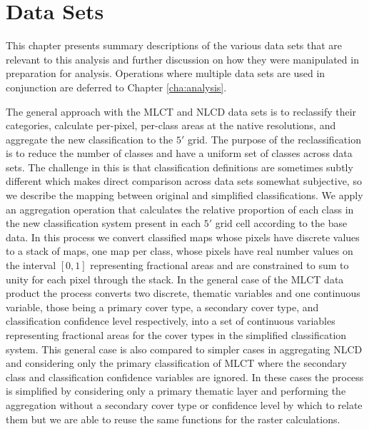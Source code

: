 









\graphicspath{ {datasets/} }


\chapter{Data Sets}
\label{cha:datasets}

This chapter presents summary descriptions of the various data sets
that are relevant to this analysis and further discussion on how they
were manipulated in preparation for analysis.  Operations where
multiple data sets are used in conjunction are deferred to Chapter
\ref{cha:analysis}.

The general approach with the MLCT and NLCD data sets is to reclassify
their categories, calculate per-pixel, per-class areas at the native
resolutions, and aggregate the new classification to the $5'$ grid.
The purpose of the reclassification is to reduce the number of classes
and have a uniform set of classes across data sets.  The challenge in
this is that classification definitions are sometimes subtly different
which makes direct comparison across data sets somewhat subjective, so
we describe the mapping between original and simplified
classifications.  We apply an aggregation operation that calculates
the relative proportion of each class in the new classification system
present in each $5'$ grid cell according to the base data.  In this
process we convert classified maps whose pixels have discrete values
to a stack of maps, one map per class, whose pixels have real number
values on the interval $[0,1]$ representing fractional areas and are
constrained to sum to unity for each pixel through the stack.  In the
general case of the MLCT data product the process converts two
discrete, thematic variables and one continuous variable, those being
a primary cover type, a secondary cover type, and classification
confidence level respectively, into a set of continuous variables
representing fractional areas for the cover types in the simplified
classification system.  This general case is also compared to simpler
cases in aggregating NLCD and considering only the primary
classification of MLCT where the secondary class and classification
confidence variables are ignored.  In these cases the process is
simplified by considering only a primary thematic layer and performing
the aggregation without a secondary cover type or confidence level by
which to relate them but we are able to reuse the same functions for
the raster calculations.

